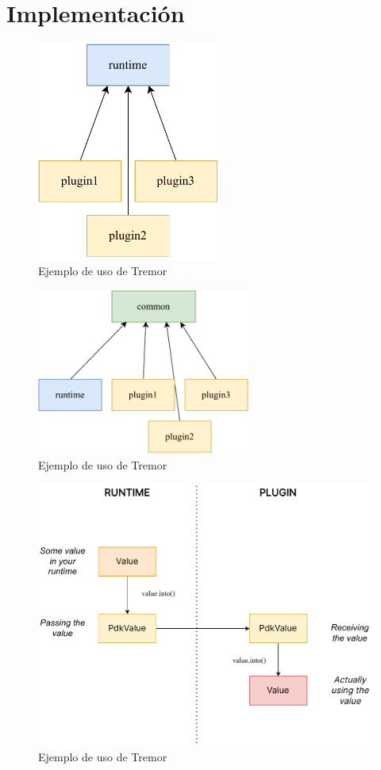 
\chapter{Implementación}


\begin{figure}
    \centering
    \includegraphics[width=6cm]{./Imagenes/separation-temporary.pdf}
    \caption{Ejemplo de uso de Tremor}%
    \label{fig:separation_temporary}
\end{figure}

\begin{figure}
    \centering
    \includegraphics[width=7cm]{./Imagenes/separation.pdf}
    \caption{Ejemplo de uso de Tremor}%
    \label{fig:separation}
\end{figure}

\begin{figure}
    \centering
    \includegraphics[width=\textwidth]{./Imagenes/simplify.pdf}
    \caption{Ejemplo de uso de Tremor}%
    \label{fig:simplify}
\end{figure}
